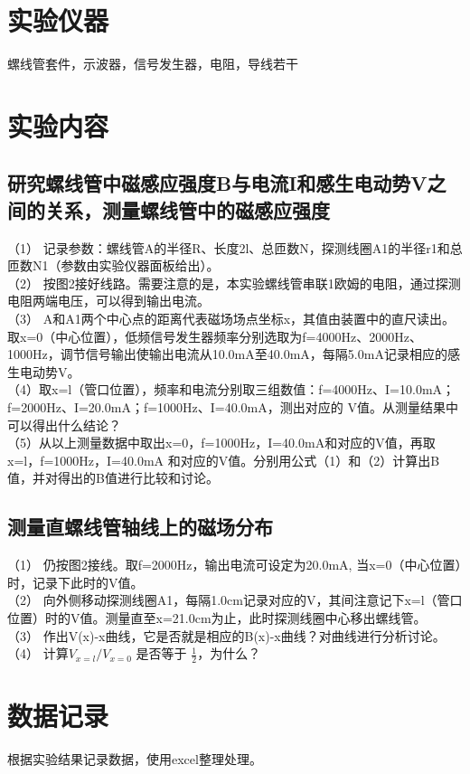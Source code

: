\documentclass[12pt,a4paper]{article}
\begin{document}
	\section{实验仪器}
	螺线管套件，示波器，信号发生器，电阻，导线若干

	\section{实验内容}
	\subsection{研究螺线管中磁感应强度B与电流I和感生电动势V之间的关系，测量螺线管中的磁感应强度}
	（1） 记录参数：螺线管A的半径R、长度2l、总匝数N，探测线圈A1的半径r1和总匝数N1（参数由实验仪器面板给出）。\\
	（2） 按图2接好线路。需要注意的是，本实验螺线管串联1欧姆的电阻，通过探测电阻两端电压，可以得到输出电流。\\
	（3） A和A1两个中心点的距离代表磁场场点坐标x，其值由装置中的直尺读出。\\
	取x=0（中心位置），低频信号发生器频率分别选取为f=4000Hz、2000Hz、1000Hz，调节信号输出使输出电流从10.0mA至40.0mA，每隔5.0mA记录相应的感生电动势V。\\
	（4）取x=l（管口位置），频率和电流分别取三组数值：f=4000Hz、I=10.0mA；f=2000Hz、I=20.0mA；f=1000Hz、I=40.0mA，测出对应的 V值。从测量结果中可以得出什么结论？\\
	（5）从以上测量数据中取出x=0，f=1000Hz，I=40.0mA和对应的V值，再取x=l，f=1000Hz，I=40.0mA 和对应的V值。分别用公式（1）和（2）计算出B值，并对得出的B值进行比较和讨论。\\

	\subsection{测量直螺线管轴线上的磁场分布}
	（1） 仍按图2接线。取f=2000Hz，输出电流可设定为20.0mA, 当x=0（中心位置）时，记录下此时的V值。\\
	（2） 向外侧移动探测线圈A1，每隔1.0cm记录对应的V，其间注意记下x=l（管口位置）时的V值。测量直至x=21.0cm为止，此时探测线圈中心移出螺线管。\\
	（3） 作出V(x)-x曲线，它是否就是相应的B(x)-x曲线？对曲线进行分析讨论。\\
	（4） 计算\(V_{x=l}/V_{x=0}\) 是否等于 \(\frac{1}{2}\)，为什么？

	\section{数据记录}
	根据实验结果记录数据，使用excel整理处理。
\end{document}
